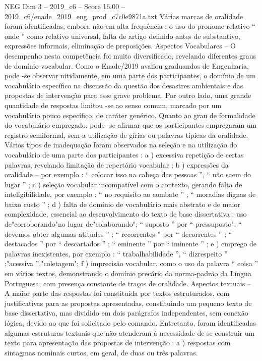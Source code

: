 \begin{textsample}{NEG Dim 3 – 2019\_c6 – Score 16.00 – 2019\_c6/enade\_2019\_eng\_prod\_c7c0e9871a.txt}
Várias marcas de oralidade foram identificadas, embora não em alta frequência : o uso do pronome relativo “ onde ” como relativo universal, falta de artigo definido antes de substantivo, expressões informais, eliminação de preposições.
Aspectos Vocabulares – O desempenho nesta competência foi muito diversificado, revelando diferentes graus de domínio vocabular.
Como o Enade/2019 avaliou graduandos de Engenharia, pode -se observar nitidamente, em uma parte dos participantes, o domínio de um vocabulário específico na discussão da questão dos desastres ambientais e das propostas de intervenção para esse grave problema.
Por outro lado, uma grande quantidade de respostas limitou -se ao senso comum, marcado por um vocabulário pouco específico, de caráter genérico.
Quanto ao grau de formalidade do vocabulário empregado, pode -se afirmar que os participantes empregaram um registro semiformal, sem a utilização de gírias ou palavras típicas da oralidade.
Vários tipos de inadequação foram observados na seleção e na utilização do vocabulário de uma parte dos participantes : a ) excessiva repetição de certas palavras, revelando limitação de repertório vocabular ; b ) expressões da oralidade – por exemplo : “ colocar isso na cabeça das pessoas ”, “ não saem do lugar ” ; c ) seleção vocabular incompatível com o contexto, gerando falta de inteligibilidade, por exemplo : “ no requisito ao combate ” ; “ moradias dignas de baixo custo ” ; d ) falta de domínio de vocabulário mais abstrato e de maior complexidade, essencial ao desenvolvimento do texto de base dissertativa : uso de"corroborando"no lugar de"colaborando"; “ suposto ” por “ pressuposto"; “ devemos obter algumas atitudes ” ; “ recorrentes ” por “ decorrentes ” ; “ destacados ” por “ descartados ” ; “ eminente ” por “ iminente ” ; e ) emprego de palavras inexistentes, por exemplo : “ trabalhabilidade ”, “ dizrespeito ” ;"acessiva ”,"coletagem"; f ) imprecisão vocabular, como o uso da palavra “ coisa ” em vários textos, demonstrando o domínio precário da norma-padrão da Língua Portuguesa, com presença constante de traços de oralidade.
Aspectos textuais – A maior parte das respostas foi constituída por textos estruturados, com justificativas para as propostas apresentadas, constituindo um pequeno texto de base dissertativa, mas dividido em dois parágrafos independentes, sem conexão lógica, devido ao que foi solicitado pelo comando.
Entretanto, foram identificadas algumas estruturas textuais que não atenderam à necessidade de se construir um texto para apresentação das propostas de intervenção : a ) respostas com sintagmas nominais curtos, em geral, de duas ou três palavras.

\end{textsample}
